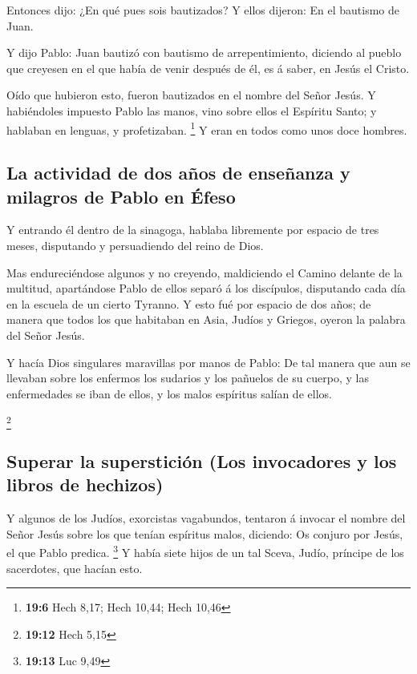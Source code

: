  Entonces dijo: ¿En qué pues sois bautizados? Y ellos
dijeron: En el bautismo de Juan.

 Y dijo Pablo: Juan bautizó con bautismo de arrepentimiento,
diciendo al pueblo que creyesen en el que había de venir después de él,
es á saber, en Jesús el Cristo.

 Oído que hubieron esto, fueron bautizados en el nombre del
Señor Jesús.  Y habiéndoles impuesto Pablo las manos, vino
sobre ellos el Espíritu Santo; y hablaban en lenguas, y profetizaban.
\footnote{\textbf{19:6} Hech 8,17; Hech 10,44; Hech 10,46} 
Y eran en todos como unos doce hombres.

\hypertarget{la-actividad-de-dos-auxf1os-de-enseuxf1anza-y-milagros-de-pablo-en-uxe9feso}{%
\subsection{La actividad de dos años de enseñanza y milagros de Pablo en
Éfeso}\label{la-actividad-de-dos-auxf1os-de-enseuxf1anza-y-milagros-de-pablo-en-uxe9feso}}

 Y entrando él dentro de la sinagoga, hablaba libremente por
espacio de tres meses, disputando y persuadiendo del reino de Dios.

 Mas endureciéndose algunos y no creyendo, maldiciendo el
Camino delante de la multitud, apartándose Pablo de ellos separó á los
discípulos, disputando cada día en la escuela de un cierto Tyranno.
 Y esto fué por espacio de dos años; de manera que todos
los que habitaban en Asia, Judíos y Griegos, oyeron la palabra del Señor
Jesús.

 Y hacía Dios singulares maravillas por manos de Pablo:
 De tal manera que aun se llevaban sobre los enfermos los
sudarios y los pañuelos de su cuerpo, y las enfermedades se iban de
ellos, y los malos espíritus salían de ellos.

\footnote{\textbf{19:12} Hech 5,15}

\hypertarget{superar-la-supersticiuxf3n-los-invocadores-y-los-libros-de-hechizos}{%
\subsection{Superar la superstición (Los invocadores y los libros de
hechizos)}\label{superar-la-supersticiuxf3n-los-invocadores-y-los-libros-de-hechizos}}

 Y algunos de los Judíos, exorcistas vagabundos, tentaron á
invocar el nombre del Señor Jesús sobre los que tenían espíritus malos,
diciendo: Os conjuro por Jesús, el que Pablo predica. \footnote{\textbf{19:13}
  Luc 9,49}  Y había siete hijos de un tal Sceva, Judío,
príncipe de los sacerdotes, que hacían esto.

